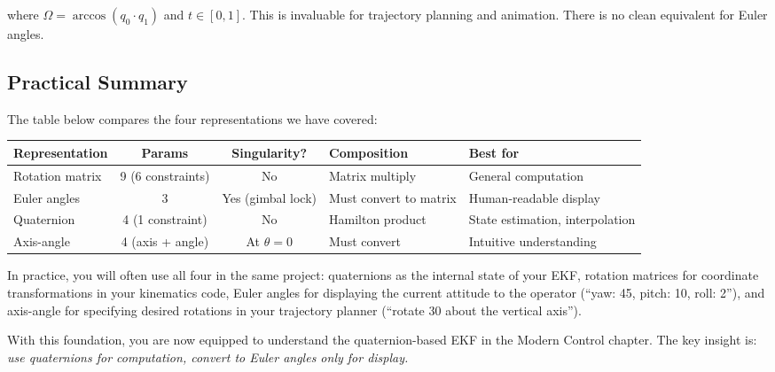 where $\Omega = \arccos(q_0 \cdot q_1)$ and $t \in [0, 1]$. This is invaluable for trajectory planning and animation. There is no clean equivalent for Euler angles.

\subsection{Practical Summary}

The table below compares the four representations we have covered:

\begin{table}[H]
\centering
\begin{tabular}{@{}lccll@{}}
\toprule
\textbf{Representation} & \textbf{Params} & \textbf{Singularity?} & \textbf{Composition} & \textbf{Best for} \\
\midrule
Rotation matrix & 9 (6 constraints) & No & Matrix multiply & General computation \\
Euler angles & 3 & Yes (gimbal lock) & Must convert to matrix & Human-readable display \\
Quaternion & 4 (1 constraint) & No & Hamilton product & State estimation, interpolation \\
Axis-angle & 4 (axis + angle) & At $\theta = 0$ & Must convert & Intuitive understanding \\
\bottomrule
\end{tabular}
\end{table}

In practice, you will often use all four in the same project: quaternions as the internal state of your EKF, rotation matrices for coordinate transformations in your kinematics code, Euler angles for displaying the current attitude to the operator (``yaw: 45\textdegree, pitch: 10\textdegree, roll: 2\textdegree''), and axis-angle for specifying desired rotations in your trajectory planner (``rotate 30\textdegree{} about the vertical axis'').

With this foundation, you are now equipped to understand the quaternion-based EKF in the Modern Control chapter. The key insight is: \textit{use quaternions for computation, convert to Euler angles only for display.}
